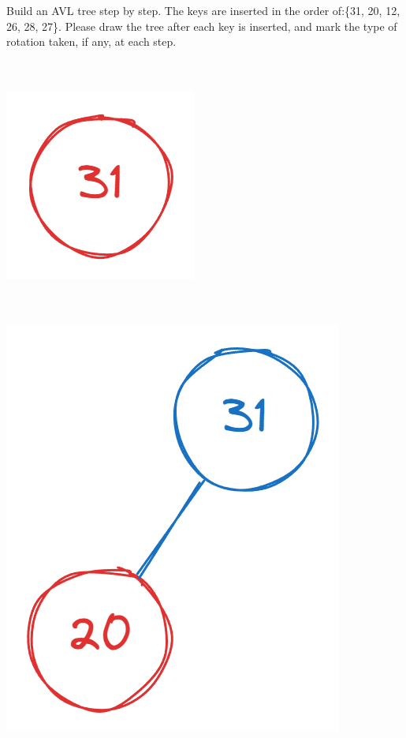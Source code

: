\noindent {} 
Build an AVL tree step by step. The keys are inserted in the order of:\{31, 20, 12, 26, 28, 27\}. Please draw the tree after each key is inserted, and mark the type of rotation taken, if any, at each step.

\noindent \begin{minipage}[t]{.24\textwidth}
    \vspace{0pt}
     \\ \\
    \centering
    \includegraphics[width=0.36\linewidth]{HWs//HW7//figures/3_1.png}
\end{minipage}
\begin{minipage}[t]{.24\textwidth}
    \vspace{0pt}
     \\ \\
    \centering
    \includegraphics[width=0.65\linewidth]{HWs//HW7//figures/3_2.png}
\end{minipage}
